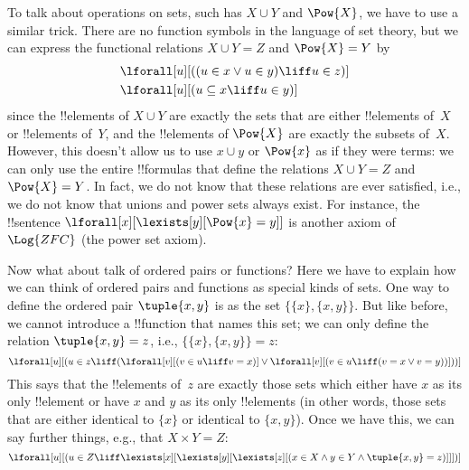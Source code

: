 \documentclass[../../include/open-logic-section]{subfiles}
\begin{document}
To talk about operations on sets, such has $X \cup Y$ and $\Pow{X}$, we
have to use a similar trick.  There are no function symbols in the
language of set theory, but we can express the functional relations $X
\cup Y = Z$ and $\Pow{X} = Y$ by
\begin{align*}
& \lforall[u][((u \in x \lor u \in y) \liff u \in z)]\\
& \lforall[u][(u \subseteq x \liff u \in y )]
\end{align*}
since the !!{element}s of $X \cup Y$ are exactly the sets that are
either !!{element}s of~$X$ or !!{element}s of~$Y$, and the
!!{element}s of $\Pow{X}$ are exactly the subsets of~$X$.  However,
this doesn't allow us to use $x \cup y$ or $\Pow{x}$ as if they were
terms: we can only use the entire !!{formula}s that define the
relations $X \cup Y = Z$ and $\Pow{X} = Y$. In fact, we do not know
that these relations are ever satisfied, i.e., we do not know that
unions and power sets always exist. For instance, the !!{sentence}
$\lforall[x][\lexists[y][\Pow{x} = y]]$ is another axiom
of~$\Log{ZFC}$ (the power set axiom).

Now what about talk of ordered pairs or functions?  Here we have to
explain how we can think of ordered pairs and functions as special
kinds of sets.  One way to define the ordered pair $\tuple{x, y}$ is
as the set $\{\{x\}, \{x, y\}\}$.  But like before, we cannot
introduce a !!{function} that names this set; we can only define the
relation $\tuple{x, y} = z$, i.e., $\{\{x\}, \{x, y\}\} = z$:
\[
\lforall[u][(u \in z \liff (\lforall[v][(v \in u \liff v = x)] \lor
  \lforall[v][(v \in u \liff (v = x \lor v = y))]))]
\]
This says that the !!{element}s of~$z$ are exactly those sets which
either have $x$ as its only !!{element} or have $x$ and $y$ as its
only !!{element}s (in other words, those sets that are either identical
to $\{x\}$ or identical to $\{x, y\}$).  Once we have this, we can say
further things, e.g., that $X \times Y = Z$:
\[
\lforall[u][(u \in Z \liff \lexists[x][\lexists[y][\lexists[z][(x \in
        X \land y \in Y \land \tuple{x, y} = z)]]])]
\]
\end{document}
